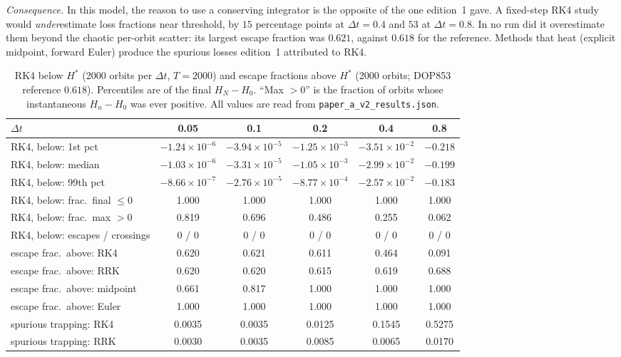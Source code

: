 \documentclass[11pt,a4paper]{article}
\theoremstyle{definition}
\newcommand{\Hs}{H^{*}}
\begin{document}
\emph{Consequence.} In this model, the reason to use a conserving integrator is the opposite of the one edition~1 gave. A fixed-step RK4 study would \emph{under}estimate loss fractions near threshold, by $15$ percentage points at $\Delta t=0.4$ and $53$ at $\Delta t=0.8$. In no run did it overestimate them beyond the chaotic per-orbit scatter: its largest escape fraction was $0.621$, against $0.618$ for the reference. Methods that heat (explicit midpoint, forward Euler) produce the spurious losses edition~1 attributed to RK4.

\begin{table}[htbp]
\centering
\caption{RK4 below $\Hs$ (2000 orbits per $\Delta t$, $T=2000$) and escape fractions above $\Hs$ (2000 orbits; DOP853 reference $0.618$). Percentiles are of the final $H_N-H_0$. ``Max $>0$'' is the fraction of orbits whose instantaneous $H_n-H_0$ was ever positive. All values are read from \texttt{paper\_a\_v2\_results.json}.}
\label{tab:result}
\small
\begin{tabular}{@{}l ccccc@{}}
\toprule
$\Delta t$ & 0.05 & 0.1 & 0.2 & 0.4 & 0.8 \\
\midrule
RK4, below: 1st pct & $-1.24\times10^{-6}$ & $-3.94\times10^{-5}$ & $-1.25\times10^{-3}$ & $-3.51\times10^{-2}$ & $-0.218$ \\
RK4, below: median & $-1.03\times10^{-6}$ & $-3.31\times10^{-5}$ & $-1.05\times10^{-3}$ & $-2.99\times10^{-2}$ & $-0.199$ \\
RK4, below: 99th pct & $-8.66\times10^{-7}$ & $-2.76\times10^{-5}$ & $-8.77\times10^{-4}$ & $-2.57\times10^{-2}$ & $-0.183$ \\
RK4, below: frac.\ final $\le0$ & 1.000 & 1.000 & 1.000 & 1.000 & 1.000 \\
RK4, below: frac.\ max $>0$ & 0.819 & 0.696 & 0.486 & 0.255 & 0.062 \\
RK4, below: escapes / crossings & 0 / 0 & 0 / 0 & 0 / 0 & 0 / 0 & 0 / 0 \\
\midrule
escape frac.\ above: RK4 & 0.620 & 0.621 & 0.611 & 0.464 & 0.091 \\
escape frac.\ above: RRK & 0.620 & 0.620 & 0.615 & 0.619 & 0.688 \\
escape frac.\ above: midpoint & 0.661 & 0.817 & 1.000 & 1.000 & 1.000 \\
escape frac.\ above: Euler & 1.000 & 1.000 & 1.000 & 1.000 & 1.000 \\
spurious trapping: RK4 & 0.0035 & 0.0035 & 0.0125 & 0.1545 & 0.5275 \\
spurious trapping: RRK & 0.0030 & 0.0035 & 0.0085 & 0.0065 & 0.0170 \\
\bottomrule
\end{tabular}
\end{table}
\end{document}
